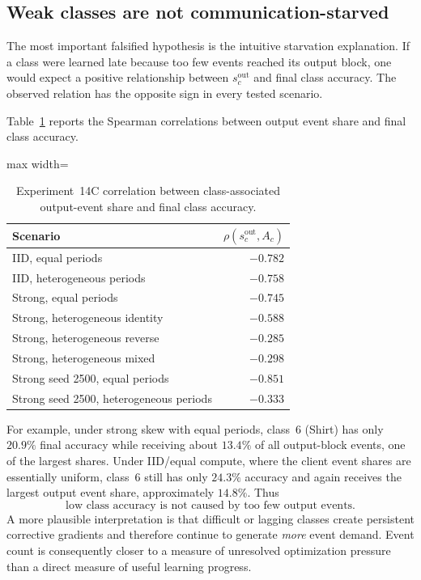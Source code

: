 \subsection{Weak classes are not communication-starved}

The most important falsified hypothesis is the intuitive starvation explanation. If a class were learned late because too few events reached its output block, one would expect a positive relationship between $s_c^{\mathrm{out}}$ and final class accuracy. The observed relation has the opposite sign in every tested scenario.

Table~\ref{tab:exp14c-output-share-correlation} reports the Spearman correlations between output event share and final class accuracy.
\begin{table}[ht]
\centering
\small
\caption{Experiment~14C correlation between class-associated output-event share and final class accuracy.}
\label{tab:exp14c-output-share-correlation}
\begin{adjustbox}{max width=\textwidth}
\begin{tabular}{lr}
\toprule
Scenario & $\rho(s_c^{\mathrm{out}},A_c)$\\
\midrule
IID, equal periods & $-0.782$\\
IID, heterogeneous periods & $-0.758$\\
Strong, equal periods & $-0.745$\\
Strong, heterogeneous identity & $-0.588$\\
Strong, heterogeneous reverse & $-0.285$\\
Strong, heterogeneous mixed & $-0.298$\\
Strong seed 2500, equal periods & $-0.851$\\
Strong seed 2500, heterogeneous periods & $-0.333$\\
\bottomrule
\end{tabular}
\end{adjustbox}
\end{table}

For example, under strong skew with equal periods, class~6 (Shirt) has only $20.9\%$ final accuracy while receiving about $13.4\%$ of all output-block events, one of the largest shares. Under IID/equal compute, where the client event shares are essentially uniform, class~6 still has only $24.3\%$ accuracy and again receives the largest output event share, approximately $14.8\%$. Thus
\begin{equation}
\boxed{\text{low class accuracy is not caused by too few output events.}}
\end{equation}
A more plausible interpretation is that difficult or lagging classes create persistent corrective gradients and therefore continue to generate \emph{more} event demand. Event count is consequently closer to a measure of unresolved optimization pressure than a direct measure of useful learning progress.


